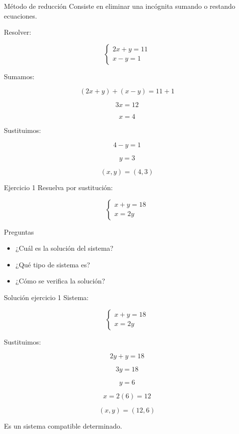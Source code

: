 \documentclass[aspectratio=169]{beamer}
\begin{document}
	\begin{frame}{Método de reducción}
		Consiste en eliminar una incógnita sumando o restando ecuaciones.
		
		\bigskip
		
		Resolver:
		
		\[
		\begin{cases}
			2x+y=11\\
			x-y=1
		\end{cases}
		\]
		
		Sumamos:
		
		\[
		(2x+y)+(x-y)=11+1
		\]
		
		\[
		3x=12
		\]
		
		\[
		x=4
		\]
		
		Sustituimos:
		
		\[
		4-y=1
		\]
		
		\[
		y=3
		\]
		
		\[
		\boxed{(x,y)=(4,3)}
		\]
	\end{frame}
	
	\begin{frame}{Ejercicio 1}
		Resuelva por sustitución:
		
		\[
		\begin{cases}
			x+y=18\\
			x=2y
		\end{cases}
		\]
		
		\bigskip
		
		\begin{block}{Preguntas}
			\begin{itemize}
				\item ¿Cuál es la solución del sistema?
				\item ¿Qué tipo de sistema es?
				\item ¿Cómo se verifica la solución?
			\end{itemize}
		\end{block}
	\end{frame}
	
	\begin{frame}{Solución ejercicio 1}
		Sistema:
		
		\[
		\begin{cases}
			x+y=18\\
			x=2y
		\end{cases}
		\]
		
		Sustituimos:
		
		\[
		2y+y=18
		\]
		
		\[
		3y=18
		\]
		
		\[
		y=6
		\]
		
		\[
		x=2(6)=12
		\]
		
		\[
		\boxed{(x,y)=(12,6)}
		\]
		
		Es un sistema compatible determinado.
	\end{frame}
	
\end{document}
